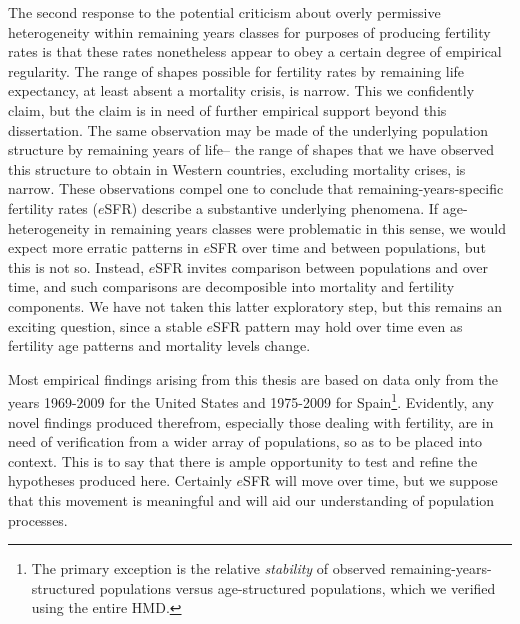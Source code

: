 The second response to the potential criticism about overly permissive
heterogeneity within remaining years classes for purposes of producing
fertility rates is that these rates nonetheless appear to obey a
certain degree of empirical regularity. The range of shapes possible for
fertility rates by remaining life expectancy, at least absent a mortality
crisis, is narrow. This we confidently claim, but the claim is in need of
further empirical support beyond this dissertation. The same observation may be made of
the underlying population structure by remaining years of life-- the range of 
shapes that we have observed this structure to obtain in Western countries, 
excluding mortality crises, is
narrow. These observations compel one to conclude that
remaining-years-specific fertility rates ($e$SFR) describe a substantive
underlying phenomena. If age-heterogeneity in remaining years classes 
were problematic in this sense, we would expect more erratic patterns in
$e$SFR over time and between populations, but this is not so. Instead, $e$SFR
invites comparison between populations and over time, and such comparisons are
decomposible into mortality and fertility components. We have not
taken this latter exploratory step, but this remains an exciting question, since
a stable $e$SFR pattern may hold over time even as fertility age patterns and
mortality levels change.

Most empirical findings arising from this thesis are based on data only
from the years 1969-2009 for the United States and 1975-2009 for
Spain\footnote{The primary exception is the relative \textit{stability} of
observed remaining-years-structured populations versus age-structured
populations, which we verified using the entire HMD.}. Evidently, any
novel findings produced therefrom, especially those dealing with fertility, 
are in need of verification from a wider array of
populations, so as to be placed into context. This is to say that there is ample opportunity to test
and refine the hypotheses produced here. Certainly $e$SFR will move over time,
but we suppose that this movement is meaningful and will aid our understanding
of population processes.

